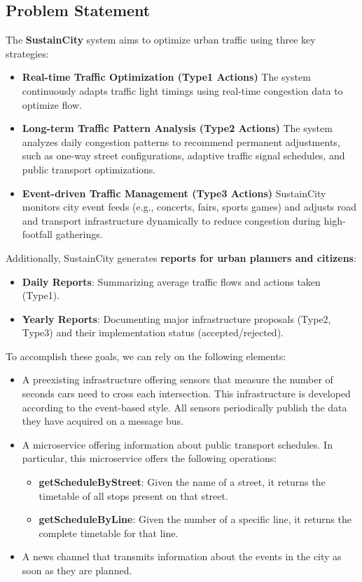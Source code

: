 \documentclass[a4paper,12pt]{article}
\begin{document}
\subsection*{Problem Statement}
The \textbf{SustainCity} system aims to optimize urban traffic using three key strategies:
\begin{itemize}
    \item \textbf{Real-time Traffic Optimization (Type1 Actions)} 
    The system continuously adapts traffic light timings using real-time congestion data to optimize flow.  
    \item \textbf{Long-term Traffic Pattern Analysis (Type2 Actions)}  
    The system analyzes daily congestion patterns to recommend permanent adjustments, such as one-way street configurations, adaptive traffic signal schedules, and public transport optimizations.
    \item \textbf{Event-driven Traffic Management (Type3 Actions)}
    SustainCity monitors city event feeds (e.g., concerts, fairs, sports games) and adjusts road and transport infrastructure dynamically to reduce congestion during high-footfall gatherings.
\end{itemize}

\noindent Additionally, SustainCity generates \textbf{reports for urban planners and citizens}:
\begin{itemize}
    \item \textbf{Daily Reports}: Summarizing average traffic flows and actions taken (Type1).
    \item \textbf{Yearly Reports}: Documenting major infrastructure proposals (Type2, Type3) and their implementation status (accepted/rejected).
\end{itemize}

\noindent To accomplish these goals, we can rely on the following elements: 
\begin{itemize}
    \item A preexisting infrastructure offering sensors that measure the number of seconds cars need to cross each intersection. This infrastructure is developed according to the event-based style. All sensors periodically publish the data they have acquired on a message bus. 
    \item A microservice offering information about public transport schedules. In particular, this microservice offers the following operations: 
    \begin{itemize} 
        \item \textbf{getScheduleByStreet}: Given the name of a street, it returns the timetable of all stops present on that street. 
        \item \textbf{getScheduleByLine}: Given the number of a specific line, it returns the complete timetable for that line.   
    \end{itemize}
    \item A news channel that transmits information about the events in the city as soon as they are planned.
\end{itemize}
\end{document}
